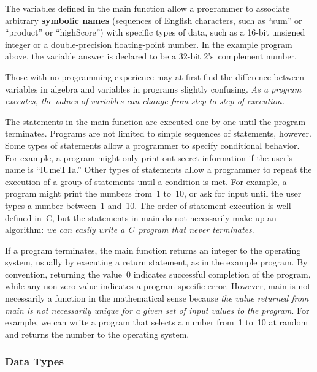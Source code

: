 The variables defined in the {\tfix main} function allow a programmer
to associate arbitrary {\bf symbolic names} (sequences of English characters, 
such as ``sum'' or ``product'' or ``highScore'') with specific
types of data, such as a \mbox{16-bit} unsigned integer or a
double-precision floating-point number. 
%
In the example program above, the variable {\tfix answer} is declared
to be a \mbox{32-bit} \mbox{2's}~complement number.

Those with no programming experience may at first find the difference
between variables in algebra and variables in programs slightly 
confusing.  {\it As a program executes, the values of variables can 
change from step to step of execution.}

The statements in the {\tfix main} function are executed one by one
until the program terminates.  
%
Programs are not limited to simple sequences of statements, however.
Some types of statements allow a programmer
to specify conditional behavior.  For example, a program might only
print out secret information if the user's name is ``lUmeTTa.''
Other types of statements allow a programmer to repeat the execution
of a group of statements until a condition is met.  For example, a program
might print the numbers from~1 to~10, or ask for input until the user
types a number between~1 and~10.
%
The order of statement execution is well-defined in~C, but the
statements in {\tfix main} do not necessarily make up an algorithm:
{\em we can easily write a C~program that never terminates}.

If a program terminates, the {\tfix main} function
returns an integer to the operating system, usually by executing
a {\tfix return} statement, as in the example program.
%
By convention, returning the value~0 indicates successful completion
of the program, while any non-zero value indicates a program-specific
error.
%
However, {\tfix main} is not necessarily a function in the mathematical 
sense because {\em the value returned from {\tfix main} is not 
necessarily unique for a given set of input values to the program}.  
%
For example, we can write a program that selects a number from~1 to~10 
at random and returns the number to the operating system.
\\



\subsubsection{Data Types}

